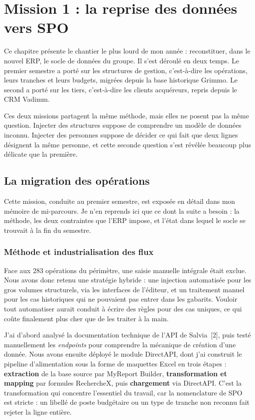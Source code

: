 
\chapter{Mission 1 : la reprise des données vers SPO}
\minitoc
\newpage

Ce chapitre présente le chantier le plus lourd de mon année : reconstituer, dans le nouvel ERP,
le socle de données du groupe. Il s'est déroulé en deux temps. Le premier semestre a porté sur
les structures de gestion, c'est-à-dire les opérations, leurs tranches et leurs budgets,
migrées depuis la base historique Grimmo. Le second a porté sur les tiers, c'est-à-dire les
clients acquéreurs, repris depuis le CRM Vadimm.

Ces deux missions partagent la même méthode, mais elles ne posent pas la même question.
Injecter des structures suppose de comprendre un modèle de données inconnu. Injecter des
personnes suppose de décider ce qui fait que deux lignes désignent la même personne, et cette
seconde question s'est révélée beaucoup plus délicate que la première.

\section{La migration des opérations}

Cette mission, conduite au premier semestre, est exposée en détail dans mon mémoire de
mi-parcours. Je n'en reprends ici que ce dont la suite a besoin : la méthode, les deux
contraintes que l'ERP impose, et l'état dans lequel le socle se trouvait à la fin du semestre.

\subsection{Méthode et industrialisation des flux}

Face aux 283 opérations du périmètre, une saisie manuelle intégrale était exclue. Nous avons
donc retenu une stratégie hybride : une injection automatisée pour les gros volumes
structurels, via les interfaces de l'éditeur, et un traitement manuel pour les cas historiques
qui ne pouvaient pas entrer dans les gabarits. Vouloir tout automatiser aurait conduit à écrire
des règles pour des cas uniques, ce qui coûte finalement plus cher que de les traiter à la
main.

J'ai d'abord analysé la documentation technique de l'API de Salvia~[2], puis testé
manuellement les \emph{endpoints} pour comprendre la mécanique de création d'une donnée. Nous
avons ensuite déployé le module DirectAPI, dont j'ai construit le pipeline d'alimentation sous
la forme de maquettes Excel en trois étapes : \textbf{extraction} de la base source par MyReport
Builder, \textbf{transformation et mapping} par formules RechercheX, puis \textbf{chargement}
via DirectAPI. C'est la transformation qui concentre l'essentiel du travail, car la nomenclature
de SPO est stricte : un libellé de poste budgétaire ou un type de tranche non reconnu fait
rejeter la ligne entière.

